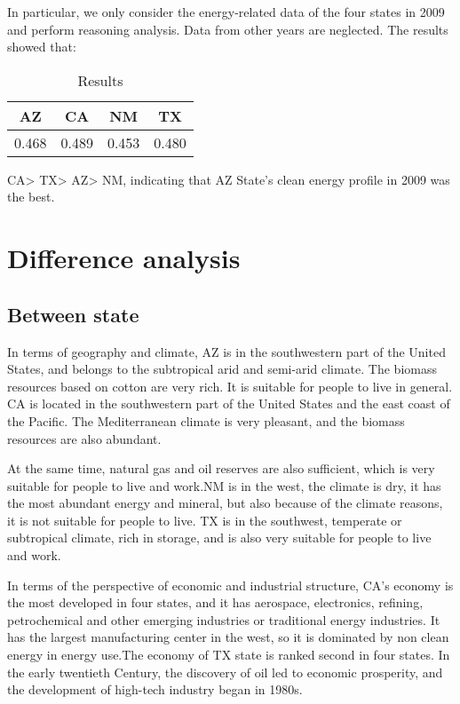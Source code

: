 \documentclass[a4paper]{article}
\begin{document}
In particular, we only consider the energy-related data of the four states in 2009 and perform reasoning analysis. Data from other years are neglected. The results showed that:

\begin{table}[!htbp]
\centering
\begin{tabular}{cccc}
\toprule
AZ & CA & NM & TX\\
\midrule
0.468 & 0.489 & 0.453 & 0.480\\
\bottomrule
\end{tabular}
\caption{Results}\label{tab:aStrangeTable}
\end{table}

CA> TX> AZ> NM, indicating that AZ State's clean energy profile in 2009 was the best.


\section{Difference analysis}

\subsection{Between state}
In terms of geography and climate, AZ is in the southwestern part of the United States, and belongs to the subtropical arid and semi-arid climate. The biomass resources based on cotton are very rich. It is suitable for people to live in general. CA is located in the southwestern part of the United States and the east coast of the Pacific. The Mediterranean climate is very pleasant, and the biomass resources are also abundant. 

At the same time, natural gas and oil reserves are also sufficient, which is very suitable for people to live and work.NM is in the west, the climate is dry, it has the most abundant energy and mineral, but also because of the climate reasons, it is not suitable for people to live. TX is in the southwest, temperate or subtropical climate, rich in storage, and is also very suitable for people to live and work.

In terms of the perspective of economic and industrial structure, CA's economy is the most developed in four states, and it has aerospace, electronics, refining, petrochemical and other emerging industries or traditional energy industries. It has the largest manufacturing center in the west, so it is dominated by non clean energy in energy use.The economy of TX state is ranked second in four states. In the early twentieth Century, the discovery of oil led to economic prosperity, and the development of high-tech industry began in 1980s. 
\end{document}
